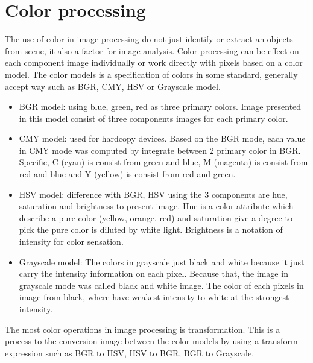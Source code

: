 \section{Color processing}\label{color_model}
The use of color in image processing do not just identify or extract an objects from scene, it also a factor for image analysis. Color processing can be effect on each component image individually or work directly with pixels based on a color model. The color models is a specification of colors in some standard, generally accept way such as BGR, CMY, HSV or Grayscale model.
\begin{itemize}
\item BGR model: using blue, green, red as three primary colors. Image presented in this model consist of three components images for each primary color.
\item CMY model: used for hardcopy devices. Based on the BGR mode, each value in CMY mode was computed by integrate between 2 primary color in BGR. Specific, C (cyan) is consist from green and blue, M (magenta) is consist from red and blue and Y (yellow) is consist from red and green.
\item HSV model: difference with BGR, HSV using the 3 components are hue, saturation and brightness to present image. Hue is a color attribute which describe a pure color (yellow, orange, red) and saturation give a degree to pick the pure color is diluted by white light. Brightness is a notation of intensity for color sensation.
\item Grayscale model: The colors in grayscale just black and white because it just carry the intensity information on each pixel. Because that, the image in grayscale mode was called black and white image. The color of each pixels in image from black, where have weakest intensity to white at the strongest intensity.
\end{itemize}
The most color operations in image processing is transformation. This is a process to the conversion image between the color models by using a transform expression such as BGR to HSV, HSV to BGR, BGR to Grayscale.
